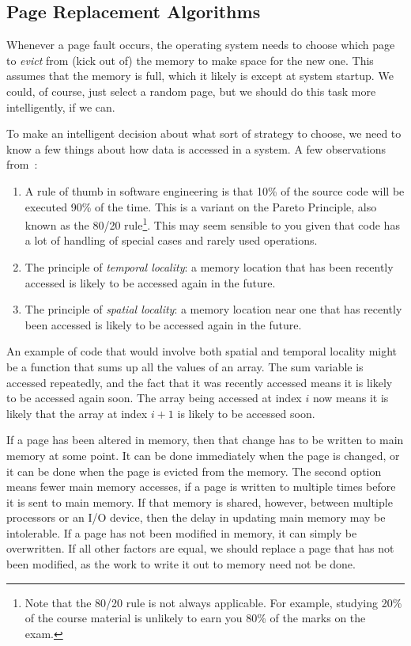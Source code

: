 \subsection*{Page Replacement Algorithms}
Whenever a page fault occurs, the operating system needs to choose which page to \textit{evict} from (kick out of) the memory to make space for the new one. This assumes that the memory is full, which it likely is except at system startup. We could, of course, just select a random page, but we should do this task more intelligently, if we can.

To make an intelligent decision about what sort of strategy to choose, we need to know a few things about how data is accessed in a system. A few observations from~\cite{mte241}:

\begin{enumerate}
	\item A rule of thumb in software engineering is that 10\% of the source code will be executed 90\% of the time. This is a variant on the Pareto Principle, also known as the 80/20 rule\footnote{Note that the 80/20 rule is not always applicable. For example, studying 20\% of the course material is unlikely to earn you 80\% of the marks on the exam.}. This may seem sensible to you given that code has a lot of handling of special cases and rarely used operations.
	\item The principle of \textit{temporal locality}: a memory location that has been recently accessed is likely to be accessed again in the future. 
	\item The principle of \textit{spatial locality}: a memory location near one that has recently been accessed is likely to be accessed again in the future.
\end{enumerate}

An example of code that would involve both spatial and temporal locality might be a function that sums up all the values of an array. The sum variable is accessed repeatedly, and the fact that it was recently accessed means it is likely to be accessed again soon. The array being accessed at index $i$ now means it is likely that the array at index $i+1$ is likely to be accessed soon.

If a page has been altered in memory, then that change has to be written to main memory at some point. It can be done immediately when the page is changed, or it can be done when the page is evicted from the memory. The second option means fewer main memory accesses, if a page is written to multiple times before it is sent to main memory. If that memory is shared, however, between multiple processors or an I/O device, then the delay in updating main memory may be intolerable. If a page has not been modified in memory, it can simply be overwritten. If all other factors are equal, we should replace a page that has not been modified, as the work to write it out to memory need not be done.

